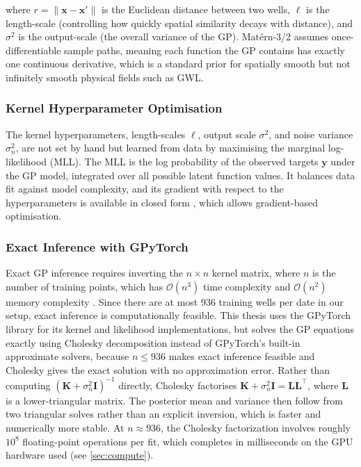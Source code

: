 where $r = \|\mathbf{x} - \mathbf{x}'\|$ is the Euclidean distance between two wells, $\ell$ is the length-scale (controlling how quickly spatial similarity decays with distance), and $\sigma^2$ is the output-scale (the overall variance of the GP). Matérn-3/2 assumes once-differentiable sample paths, meaning each function the GP contains has exactly one continuous derivative, which is a standard prior for spatially smooth but not infinitely smooth physical fields such as GWL.

\subsubsection{Kernel Hyperparameter Optimisation}

The kernel hyperparameters, length-scales $\boldsymbol{\ell}$, output scale $\sigma^2$, and noise variance $\sigma_n^2$, are not set by hand but learned from data by maximising the marginal log-likelihood (MLL). The MLL is the log probability of the observed targets $\mathbf{y}$ under the GP model, integrated over all possible latent function values. It balances data fit against model complexity, and its gradient with respect to the hyperparameters is available in closed form \citep{rasmussen2006gaussian}, which allows gradient-based optimisation.

\subsubsection{Exact Inference with GPyTorch}

Exact GP inference requires inverting the $n \times n$ kernel matrix, where $n$ is the
number of training points, which has $\mathcal{O}(n^3)$ time complexity and $\mathcal{O}(n^2)$ memory
complexity \citep{rasmussen2006gaussian}. Since there are at most 936 training wells per date in our setup, exact inference is computationally feasible. This thesis uses the GPyTorch library \citep{gardner2018gpytorch}
for its kernel and likelihood implementations, but solves the GP equations exactly using
Cholesky decomposition instead of GPyTorch's built-in approximate solvers, because $n \leq 936$ makes exact inference feasible and Cholesky gives the exact solution with no approximation error. Rather than computing $(\mathbf{K} + \sigma_n^2 \mathbf{I})^{-1}$ directly, Cholesky factorises $\mathbf{K} + \sigma_n^2 \mathbf{I} = \mathbf{L}\mathbf{L}^\top$, where $\mathbf{L}$ is a lower-triangular matrix. The posterior mean and variance then follow from two triangular solves rather than an explicit inversion, which is faster and numerically more stable. At $n \approx 936$, the Cholesky factorization involves roughly $10^8$ floating-point operations per fit, which completes in milliseconds on the GPU hardware used (see \cref{sec:compute}).

